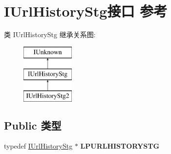 \hypertarget{interface_i_url_history_stg}{}\section{I\+Url\+History\+Stg接口 参考}
\label{interface_i_url_history_stg}
类 I\+Url\+History\+Stg 继承关系图\+:\begin{figure}[H]
\begin{center}
\leavevmode
\includegraphics[height=3.000000cm]{interface_i_url_history_stg}
\end{center}
\end{figure}
\subsection*{Public 类型}
\begin{DoxyCompactItemize}
\item 
\mbox{\label{interface_i_url_history_stg_a3e474c64e46a0e93c15a336358f401d5}} 
typedef \hyperlink{interface_i_url_history_stg}{I\+Url\+History\+Stg} $\ast$ {\bfseries L\+P\+U\+R\+L\+H\+I\+S\+T\+O\+R\+Y\+S\+TG}
\end{DoxyCompactItemize}
